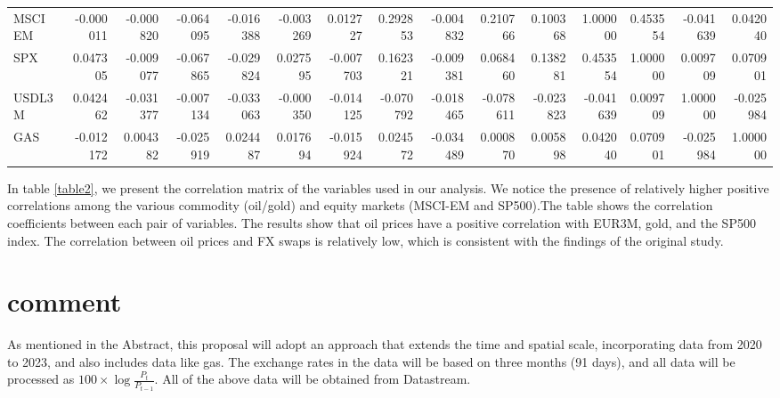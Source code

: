 \documentclass[12pt]{article}
\begin{document}
\begin{sloppypar}
\begin{table}[ht]
{\begin{tabular}{lrrrrrrrrrrrrrr}
        MSCI EM & -0.000011 & -0.000820 & -0.064095 & -0.016388 & -0.003269 & 0.012727 & 0.292853 & -0.004832 & 0.210766 & 0.100368 & 1.000000 & 0.453554 & -0.041639 & 0.042040 \\
        SPX & 0.047305 & -0.009077 & -0.067865 & -0.029824 & 0.027595 & -0.007703 & 0.162321 & -0.009381 & 0.068460 & 0.138281 & 0.453554 & 1.000000 & 0.009709 & 0.070901 \\
        USDL3M & 0.042462 & -0.031377 & -0.007134 & -0.033063 & -0.000350 & -0.014125 & -0.070792 & -0.018465 & -0.078611 & -0.023823 & -0.041639 & 0.009709 & 1.000000 & -0.025984 \\
        GAS & -0.012172 & 0.004382 & -0.025919 & 0.024487 & 0.017694 & -0.015924 & 0.024572 & -0.034489 & 0.000870 & 0.005898 & 0.042040 & 0.070901 & -0.025984 & 1.000000 \\
        \hline
    \end{tabular}}%
\end{table}

In table \ref{table2}, we present the correlation matrix of the variables used in our analysis. We notice the presence of relatively higher positive correlations among the various commodity (oil/gold) and equity markets (MSCI-EM and SP500).The table shows the correlation coefficients between each pair of variables. The results show that oil prices have a positive correlation with EUR3M, gold, and the SP500 index. The correlation between oil prices and FX swaps is relatively low, which is consistent with the findings of the original study. 

\section{comment}
As mentioned in the Abstract, this proposal will adopt an approach that extends the time and spatial scale, incorporating data from 2020 to 2023, and also includes data like gas. The exchange rates in the data will be based on three months (91 days), and all data will be processed as $100 \times \log \frac{P_t}{P_{t-1}}$. All of the above data will be obtained from Datastream.

\printbibliography
\end{sloppypar}
\end{document}
